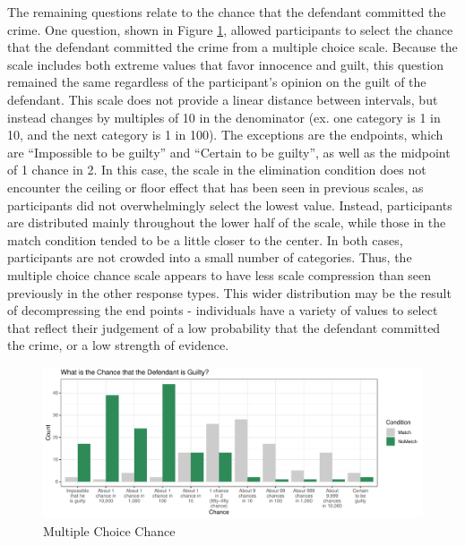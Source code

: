 \documentclass[print]{nuthesis}
\begin{document}
The remaining questions relate to the chance that the defendant committed the crime.
One question, shown in Figure \ref{fig:fixedlike}, allowed participants to select the chance that the defendant committed the crime from a multiple choice scale.
Because the scale includes both extreme values that favor innocence and guilt, this question remained the same regardless of the participant's opinion on the guilt of the defendant.
This scale does not provide a linear distance between intervals, but instead changes by multiples of 10 in the denominator (ex. one category is 1 in 10, and the next category is 1 in 100).
The exceptions are the endpoints, which are ``Impossible to be guilty'' and ``Certain to be guilty'', as well as the midpoint of 1 chance in 2.
In this case, the scale in the elimination condition does not encounter the ceiling or floor effect that has been seen in previous scales, as participants did not overwhelmingly select the lowest value.
Instead, participants are distributed mainly throughout the lower half of the scale, while those in the match condition tended to be a little closer to the center.
In both cases, participants are not crowded into a small number of categories.
Thus, the multiple choice chance scale appears to have less scale compression than seen previously in the other response types.
This wider distribution may be the result of decompressing the end points - individuals have a variety of values to select that reflect their judgement of a low probability that the defendant committed the crime, or a low strength of evidence.

\begin{figure}

{\centering \includegraphics[width=\linewidth]{thesis_files/figure-latex/fixedlike-1} 

}

\caption{Multiple Choice Chance}\label{fig:fixedlike}
\end{figure}
\end{document}
